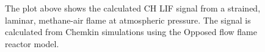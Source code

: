 \begin{figure}

\centering



\caption[Strained flame results]{The plot above shows the calculated CH LIF signal from a strained, laminar, methane-air flame at atmospheric pressure. The signal is calculated from Chemkin simulations using the Opposed flow flame reactor model.}

\label{fig:strain}

\end{figure}
